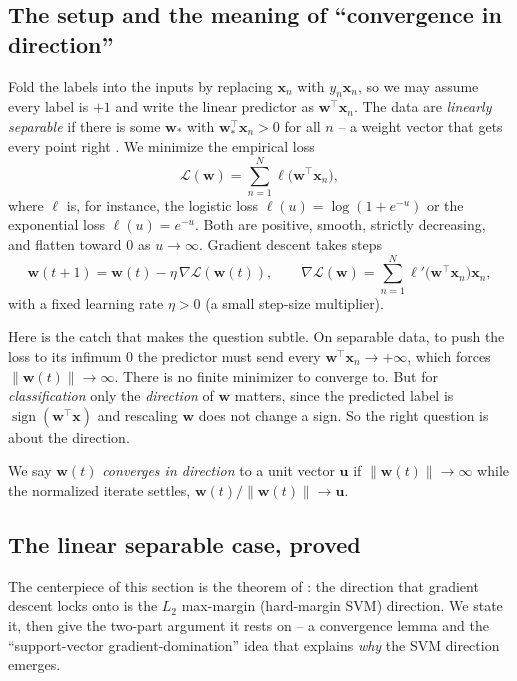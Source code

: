 \subsection{The setup and the meaning of ``convergence in direction''}

Fold the labels into the inputs by replacing $\mathbf{x}_n$ with
$y_n\mathbf{x}_n$, so we may assume every label is $+1$ and write the
linear predictor as $\mathbf{w}^\top\mathbf{x}_n$. The data are
\emph{linearly separable} if there is some $\mathbf{w}_*$ with
$\mathbf{w}_*^\top\mathbf{x}_n > 0$ for all $n$ -- a weight vector that
gets every point right \citep{soudry2018}. We minimize the empirical loss
\[
  \mathcal{L}(\mathbf{w}) = \sum_{n=1}^N \ell\!\big(\mathbf{w}^\top\mathbf{x}_n\big),
\]
where $\ell$ is, for instance, the logistic loss
$\ell(u) = \log(1+e^{-u})$ or the exponential loss $\ell(u)=e^{-u}$. Both
are positive, smooth, strictly decreasing, and flatten toward $0$ as
$u\to\infty$. Gradient descent takes steps
\[
  \mathbf{w}(t+1) = \mathbf{w}(t) - \eta\,\nabla\mathcal{L}(\mathbf{w}(t)),
  \qquad
  \nabla\mathcal{L}(\mathbf{w}) = \sum_{n=1}^N \ell'\!\big(\mathbf{w}^\top\mathbf{x}_n\big)\mathbf{x}_n,
\]
with a fixed learning rate $\eta>0$ (a small step-size multiplier).

Here is the catch that makes the question subtle. On separable data, to
push the loss to its infimum $0$ the predictor must send every
$\mathbf{w}^\top\mathbf{x}_n\to+\infty$, which forces
$\|\mathbf{w}(t)\|\to\infty$. There is no finite minimizer to converge to.
But for \emph{classification} only the \emph{direction} of $\mathbf{w}$
matters, since the predicted label is $\operatorname{sign}(\mathbf{w}^\top
\mathbf{x})$ and rescaling $\mathbf{w}$ does not change a sign. So the
right question is about the direction.

\begin{definition}
We say $\mathbf{w}(t)$ \emph{converges in direction} to a unit vector
$\mathbf{u}$ if $\|\mathbf{w}(t)\|\to\infty$ while the normalized iterate
settles, $\mathbf{w}(t)/\|\mathbf{w}(t)\| \to \mathbf{u}$.
\end{definition}

\subsection{The linear separable case, proved}

The centerpiece of this section is the theorem of
\citet{soudry2018}: the direction that gradient descent locks onto is the
$L_2$ max-margin (hard-margin SVM) direction. We state it, then give the
two-part argument it rests on -- a convergence lemma and the
``support-vector gradient-domination'' idea that explains \emph{why} the
SVM direction emerges.


